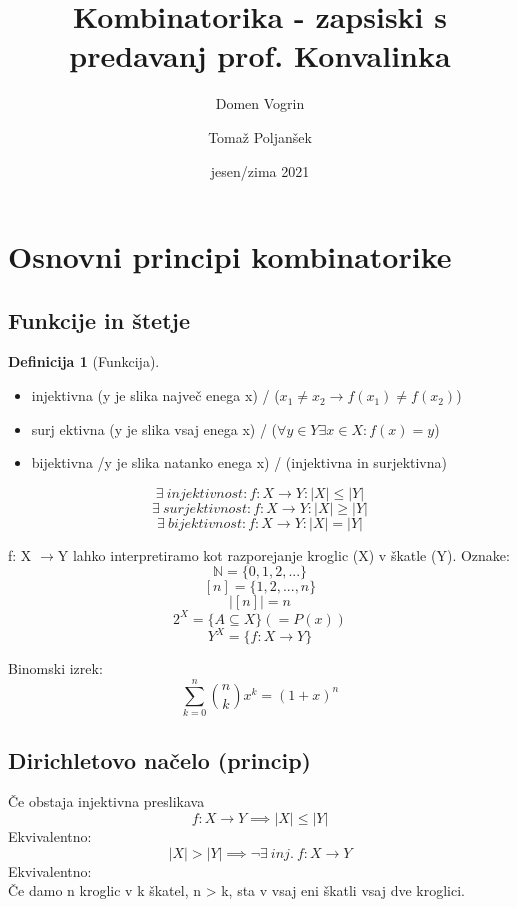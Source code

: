 \documentclass[a4paper,12pt]{article}
\theoremstyle{definition}
\newtheorem{defn}[counter]{Definicija}
\theoremstyle{remark}
\newcommand{\N}{\mathbb{N}}
\begin{document}
\title{Kombinatorika - zapsiski s predavanj prof. Konvalinka}
\author{Domen Vogrin}
\author{Tomaž Poljanšek}
\date{jesen/zima 2021}
\maketitle


\tableofcontents
\newpage
{}


\section{Osnovni principi kombinatorike}
\subsection{Funkcije in štetje}

\begin{defn}[Funkcija] \text{}

\begin{itemize}
\item injektivna (y je slika največ enega x) / ($x_1 \neq x_2 \rightarrow f(x_1) \neq f(x_2)$)
\item surj  ektivna (y je slika vsaj enega x) / ($\forall y \in Y \exists x \in X:f(x) = y$)
\item bijektivna /y je slika natanko enega x) / (injektivna in surjektivna)
\end{itemize}
\end{defn}

\[
\exists \ injektivnost: f: X\rightarrow Y: |X|\leqslant |Y|
\]
\[
\exists \ surjektivnost: f: X\rightarrow Y: |X|\geqslant |Y|
\]
\[
\exists \ bijektivnost: f: X\rightarrow Y: |X| = |Y|
\]

f: X $\rightarrow$Y lahko interpretiramo kot razporejanje kroglic (X) v škatle (Y).
Oznake:
\[
\N = \{0, 1, 2, ...\}
\]
\[
[n] = \{1, 2, ..., n\}
\]
\[
|[n]| = n
\]
\[
2^X = \{A\subseteq X\}  (= P(x))
\]
\[
Y^X = \{f: X\rightarrow Y\}
\]

Binomski izrek:
\[ \sum_{k=0}^{n}\binom{n}{k} x^k = (1+x)^n \]


\subsection{Dirichletovo načelo (princip)}
Če obstaja injektivna preslikava
\[
f: X\rightarrow Y \implies |X| \leqslant |Y|
\]
Ekvivalentno:
\[
|X| > |Y| \implies \neg \exists \ inj. \ f: X \rightarrow Y
\]
Ekvivalentno: \\
Če damo n kroglic v k škatel, n > k, sta v vsaj eni škatli vsaj dve kroglici.
\end{document}
